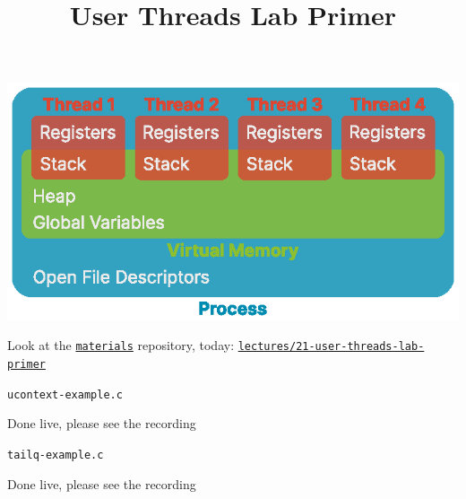 

\title{User Threads Lab Primer}


  \begin{frame}
    \titlepage
  \end{frame}

  \begin{slide}
    

    \centering
    \includegraphics{4-thread-process.eps}

  \end{slide}

  \begin{slide}
    

    Look at the
    \href{https://laforge.eecg.utoronto.ca/ece353/2024-winter/student/materials/}
         {\tt materials}
    repository, today:
    \href{https://laforge.eecg.utoronto.ca/ece353/2024-winter/student/materials/-/tree/main/lectures/21-user-threads-lab-primer}
         {\tt lectures/21-user-threads-lab-primer}

  \end{slide}

  \begin{slide}
    

    \texttt{ucontext-example.c}
    \medskip

    Done live, please see the recording

  \end{slide}

  \begin{slide}
    

    \texttt{tailq-example.c}
    \medskip

    Done live, please see the recording

  \end{slide}

